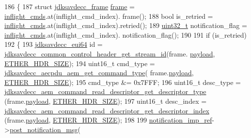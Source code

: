 \begin{DoxyCode}
186 \{
187     \textcolor{keyword}{struct }\hyperlink{structjdksavdecc__frame}{jdksavdecc\_frame} \hyperlink{gst__avb__playbin_8c_ac8e710e0b5e994c0545d75d69868c6f0}{frame} = \hyperlink{classavdecc__lib_1_1aecp__controller__state__machine_a0475b054c1890c88809394d9cef2a4c0}{inflight\_cmds}.at(inflight\_cmd\_index).
      frame();
188     \textcolor{keywordtype}{bool} is\_retried = \hyperlink{classavdecc__lib_1_1aecp__controller__state__machine_a0475b054c1890c88809394d9cef2a4c0}{inflight\_cmds}.at(inflight\_cmd\_index).retried();
189     \hyperlink{parse_8c_a6eb1e68cc391dd753bc8ce896dbb8315}{uint32\_t} notification\_flag = \hyperlink{classavdecc__lib_1_1aecp__controller__state__machine_a0475b054c1890c88809394d9cef2a4c0}{inflight\_cmds}.at(inflight\_cmd\_index).
      notification\_flag();
190 
191     \textcolor{keywordflow}{if} (is\_retried)
192     \{
193         \hyperlink{structjdksavdecc__eui64}{jdksavdecc\_eui64} \textcolor{keywordtype}{id} = 
      \hyperlink{group__jdksavdecc__avtp__common__control__header_ga99181000ee374936c8518f657fa9f5cd}{jdksavdecc\_common\_control\_header\_get\_stream\_id}(frame.
      \hyperlink{structjdksavdecc__frame_a220ad076814a31ae0163e722e523de46}{payload}, \hyperlink{namespaceavdecc__lib_a6c827b1a0d973e18119c5e3da518e65ca9512ad9b34302ba7048d88197e0a2dc0}{ETHER\_HDR\_SIZE});
194         uint16\_t cmd\_type = \hyperlink{group__aecpdu__aem_ga61a282324f09f449059b9fe710363710}{jdksavdecc\_aecpdu\_aem\_get\_command\_type}(
      frame.\hyperlink{structjdksavdecc__frame_a220ad076814a31ae0163e722e523de46}{payload}, \hyperlink{namespaceavdecc__lib_a6c827b1a0d973e18119c5e3da518e65ca9512ad9b34302ba7048d88197e0a2dc0}{ETHER\_HDR\_SIZE});
195         cmd\_type &= 0x7FFF;
196         uint16\_t desc\_type = 
      \hyperlink{group__command__read__descriptor_gaa141e1ed9bc9fd0176ab593146aa6ef2}{jdksavdecc\_aem\_command\_read\_descriptor\_get\_descriptor\_type}
      (frame.\hyperlink{structjdksavdecc__frame_a220ad076814a31ae0163e722e523de46}{payload}, \hyperlink{namespaceavdecc__lib_a6c827b1a0d973e18119c5e3da518e65ca9512ad9b34302ba7048d88197e0a2dc0}{ETHER\_HDR\_SIZE});
197         uint16\_t desc\_index = 
      \hyperlink{group__command__read__descriptor_gabfc491b799a6904e6c80e95c62755e0b}{jdksavdecc\_aem\_command\_read\_descriptor\_get\_descriptor\_index}
      (frame.\hyperlink{structjdksavdecc__frame_a220ad076814a31ae0163e722e523de46}{payload}, \hyperlink{namespaceavdecc__lib_a6c827b1a0d973e18119c5e3da518e65ca9512ad9b34302ba7048d88197e0a2dc0}{ETHER\_HDR\_SIZE});
198 
199         \hyperlink{namespaceavdecc__lib_aca078f7550e970a17b3f732c26bc3d83}{notification\_imp\_ref}->\hyperlink{classavdecc__lib_1_1notification_a2775ca78354ea78d68bf107c084b3822}{post\_notification\_msg}(

\end{DoxyCode}
